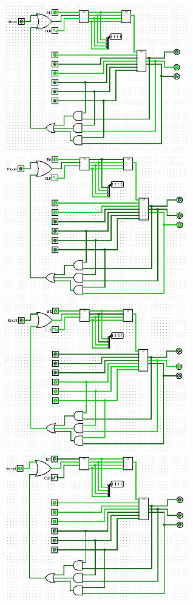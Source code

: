 \documentclass[a4paper]{article}
\begin{document}
\begin{center}
	\includegraphics[width=0.6\textwidth]{tarea-2-prueba-34.jpg}
	\includegraphics[width=0.6\textwidth]{tarea-2-prueba-35.jpg}
	\includegraphics[width=0.6\textwidth]{tarea-2-prueba-36.jpg}
	\includegraphics[width=0.6\textwidth]{tarea-2-prueba-37.jpg}

\end{center}
\end{document}
